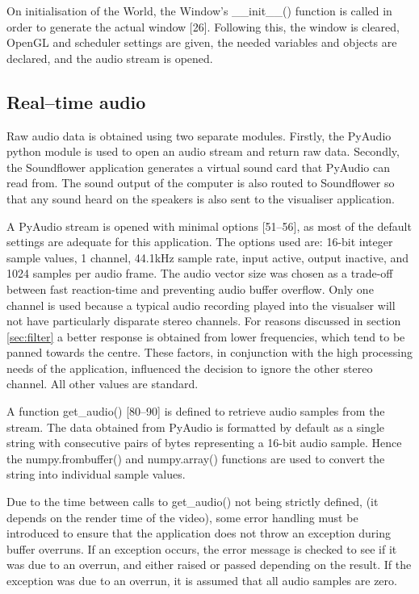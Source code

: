 \documentclass[11pt]{article}
\begin{document}
On initialisation of the World, the Window's \_\_init\_\_() function is called in order to generate the actual window [26]. Following this, the window is cleared, OpenGL and scheduler settings are given, the needed variables and objects are declared, and the audio stream is opened.


\subsection{Real--time audio}
Raw audio data is obtained using two separate modules. Firstly, the PyAudio python module is used to open an audio stream and return raw data\cite{pyaudio}. Secondly, the Soundflower application generates a virtual sound card that PyAudio can read from\cite{soundflower}. The sound output of the computer is also routed to Soundflower so that any sound heard on the speakers is also sent to the visualiser application.

A PyAudio stream is opened with minimal options [51--56], as most of the default settings are adequate for this application. The options used are: 16-bit integer sample values, 1 channel, 44.1kHz sample rate, input active, output inactive, and 1024 samples per audio frame. The audio vector size was chosen as a trade-off between fast reaction-time and preventing audio buffer overflow. Only one channel is used because a typical audio recording played into the visualser will not have particularly disparate stereo channels. For reasons discussed in section \ref{sec:filter} a better response is obtained from lower frequencies, which tend to be panned towards the centre. These factors, in conjunction with the high processing needs of the application, influenced the decision to ignore the other stereo channel. All other values are standard.

A function get\_audio() [80--90] is defined to retrieve audio samples from the stream. The data obtained from PyAudio is formatted by default as a single string with consecutive pairs of bytes representing a 16-bit audio sample. Hence the numpy.frombuffer() and numpy.array() functions are used to convert the string into individual sample values.

Due to the time between calls to get\_audio() not being strictly defined, (it depends on the render time of the video), some error handling must be introduced to ensure that the application does not throw an exception during buffer overruns. If an exception occurs, the error message is checked to see if it was due to an overrun, and either raised or passed depending on the result. If the exception was due to an overrun, it is assumed that all audio samples are zero.
\end{document}
